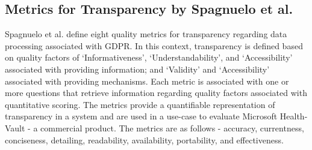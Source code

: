 \subsection*{Metrics for Transparency by Spagnuelo et al.}
Spagnuelo et al. \cite{livraga_metrics_2016} define eight quality metrics for transparency regarding data processing associated with GDPR.
In this context, transparency is defined based on quality factors of `Informativeness', `Understandability', and `Accessibility' associated with providing information; and `Validity' and `Accessibility' associated with providing mechanisms.
Each metric is associated with one or more questions that retrieve information regarding quality factors associated with quantitative scoring.
The metrics provide a quantifiable representation of transparency in a system and are used in a use-case to evaluate Microsoft Health-Vault - a commercial product.
The metrics are as follows - accuracy, currentness, conciseness, detailing, readability, availability, portability, and effectiveness.

